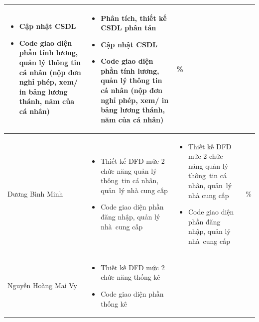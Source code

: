 \documentclass[a4paper,12pt]{report}
\begin{document}
\begin{center}
\begin{longtable}{|>{\centering\arraybackslash}p{3cm}|
        >{\centering\arraybackslash}p{5.5cm}|
        >{\centering\arraybackslash}p{5.5cm}|
        >{\centering\arraybackslash}p{1.5cm}|}
\begin{itemize}
            \item Cập nhật CSDL
            \item Code giao diện phần tính lương, quản lý thông tin cá nhân (nộp đơn nghỉ phép, xem/ in bảng lương thánh, năm của cá nhân)
        \end{itemize} &
        \begin{itemize}
            \item Phân tích, thiết kế CSDL phân tán
            \item Cập nhật CSDL
            \item Code giao diện phần tính lương, quản lý thông tin cá nhân (nộp đơn nghỉ phép, xem/ in bảng lương thánh, năm của cá nhân)
        \end{itemize}
                                                                                                                                       & 100\% \\
        \hline
        Dương Bình Minh                                                                                                                &
        \begin{itemize}
            \item Thiết kế DFD mức 2 chức năng quản lý thông~tin cá nhân, quản~lý nhà cung cấp
            \item Code giao diện phần đăng nhập, quản lý nhà~cung cấp
        \end{itemize}
                                                                                                                                       &
        \begin{itemize}
            \item Thiết kế DFD mức 2 chức năng quản lý thông~tin cá nhân, quản~lý nhà cung cấp
            \item Code giao diện phần đăng nhập, quản lý nhà~cung cấp
        \end{itemize}
                                                                                                                                       & 100\% \\
        \hline
        Nguyễn Hoàng Mai Vy                                                                                                            &
        \begin{itemize}
            \item Thiết kế DFD mức 2 chức năng thống kê
            \item Code giao diện phần thống kê
        \end{itemize}

\end{longtable}
\end{center}
\end{document}
